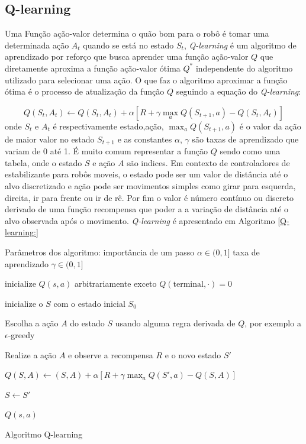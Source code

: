 \subsection{Q-learning}
Uma Função ação-valor determina o quão bom 
para o robô é tomar uma determinada ação $A_t$ quando se está no estado
$S_t$, \textit{Q-learning} é um algoritmo de aprendizado por reforço que
busca aprender uma função ação-valor $Q$ que diretamente aproxima
a função ação-valor ótima $Q^*$ independente do algoritmo utilizado
para selecionar uma ação. O que faz o algoritmo aproximar a função ótima
é o processo de atualização da função $Q$ seguindo a equação do \textit{Q-learning}:

\begin{equation} 
    Q(S_t,A_t) \leftarrow Q(S_t,A_t) + \alpha[R + \gamma  \max_aQ(S_{t +1},a) - Q(S_t,A_t)]
\end{equation}
onde $S_t$ e $A_t$ é respectivamente estado,ação, $\max_aQ(S_{t +1},a)$ é o valor da
ação de maior valor no estado $S_{t+1}$ e as constantes $\alpha$, $\gamma$ são taxas
de aprendizado que variam de 0 até 1. É muito comum representar a função $Q$
sendo como uma tabela, onde o estado $S$ e ação $A$ são indices. Em contexto de
controladores de estabilizante para robôs moveis, o estado pode ser um
valor de distância até o alvo discretizado e ação pode ser movimentos simples
como girar para esquerda, direita, ir para frente ou ir de rê. Por fim o valor é
número contínuo ou discreto derivado de uma função recompensa que poder
a a variação de distância até o alvo observada após o movimento.
\textit{Q-learning} é apresentado em Algoritmo  \ref{Q-learning:}


\begin{algorithm}[H]
    \label{Q-learning:}
    Parâmetros dos algoritmo: importância de um passo $\alpha \in (0,1]$
    taxa de aprendizado $\gamma \in (0,1] $

    
    
    inicialize $Q(s,a)$ arbitrariamente exceto $Q(\text{terminal},\cdot ) = 0$

     {
        inicialize o $S$ com o estado inicial $S_0$

        
         {
            Escolha a ação $A$ do estado $S$ usando alguma regra derivada de $Q$,
            por exemplo a $\epsilon$-greedy

            Realize a ação $A$ e observe a recompensa $R$ e o novo estado $S'$
            
            $Q(S,A) \leftarrow (S,A) + \alpha[R + \gamma \max_aQ(S',a) - Q(S,A)]$
            
            $S \leftarrow S'$


        }
        
    }
    \Retorna $Q(s,a)$
    \caption{Algoritmo Q-learning}
    
\end{algorithm}


